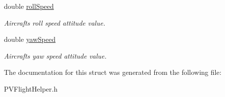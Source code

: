 \begin{DoxyCompactItemize}
\mbox{\label{struct_p_v_flight_attitude_a499a68df37e4a038d8d7efe0712306fd}} 
double \hyperlink{struct_p_v_flight_attitude_a499a68df37e4a038d8d7efe0712306fd}{roll\+Speed}
\begin{DoxyCompactList}\small\item\em Aircraft\textquotesingle{}s roll speed attitude value. \end{DoxyCompactList}\item 
\mbox{\label{struct_p_v_flight_attitude_a13cfe6f647ec342cf17f927d37ea5755}} 
double \hyperlink{struct_p_v_flight_attitude_a13cfe6f647ec342cf17f927d37ea5755}{yaw\+Speed}
\begin{DoxyCompactList}\small\item\em Aircraft\textquotesingle{}s yaw speed attitude value. \end{DoxyCompactList}\end{DoxyCompactItemize}


The documentation for this struct was generated from the following file\+:\begin{DoxyCompactItemize}
\item 
P\+V\+Flight\+Helper.\+h\end{DoxyCompactItemize}
